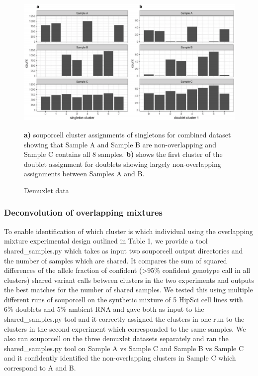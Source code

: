 \begin{figure}[htbp!]
\caption{Demuxlet data}
\label{figure:demuxlet}
\begin{centering}
\includegraphics[width=\textwidth]{demuxletdata.png} 
\par{\textbf{a)} souporcell cluster assignments of singletons for combined dataset showing that Sample A and Sample B are non-overlapping and
Sample C contains all 8 samples. \textbf{b)} shows the first cluster of the doublet assignment for doublets showing largely non-overlapping
assignments between Samples A and B.}
\end{centering}
\end{figure}

\subsubsection{Deconvolution of overlapping mixtures}

\par{
To enable identification of which cluster is which individual using the overlapping mixture experimental
design outlined in Table 1, we provide a tool shared\_samples.py which takes as input two souporcell
output directories and the number of samples which are shared. It compares the sum of squared
differences of the allele fraction of confident (>95\% confident genotype call in all clusters) shared variant
calls between clusters in the two experiments and outputs the best matches for the number of shared
samples. We tested this using multiple different runs of souporcell on the synthetic mixture of 5 HipSci
cell lines with 6\% doublets and 5\% ambient RNA and gave both as input to the shared\_samples.py tool
and it correctly assigned the clusters in one run to the clusters in the second experiment which
corresponded to the same samples. We also ran souporcell on the three demuxlet datasets separately and
ran the shared\_samples.py tool on Sample A vs Sample C and Sample B vs Sample C and it confidently
identified the non-overlapping clusters in Sample C which correspond to A and B. 
}



